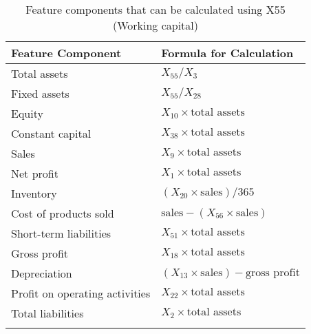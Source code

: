 \documentclass{article}      %
\begin{document}
\FloatBarrier

\begin{table}[!h]
    \centering
    \caption{Feature components that can be calculated using X55 (Working capital)}
    \begin{tabular}{l|l}
    \arrayrulecolor{black}  %
    \toprule
    \textbf{Feature Component} & \textbf{Formula for Calculation} \\
    \midrule
    \arrayrulecolor{lightgray}
    Total assets & $X_{55} / X_3$ \\
    \hline
    Fixed assets & $X_{55} / X_{28}$ \\
    \hline
    Equity & $X_{10} \times \text{total assets}$ \\
    \hline
    Constant capital & $X_{38} \times \text{total assets}$ \\
    \hline
    Sales & $X_9 \times \text{total assets}$ \\
    \hline
    Net profit & $X_1 \times \text{total assets}$ \\
    \hline
    Inventory & $(X_{20} \times \text{sales}) / 365$ \\
    \hline
    Cost of products sold & $\text{sales} - (X_{56} \times \text{sales})$ \\
    \hline
    Short-term liabilities & $X_{51} \times \text{total assets}$ \\
    \hline
    Gross profit & $X_{18} \times \text{total assets}$ \\
    \hline
    Depreciation & $(X_{13} \times \text{sales}) - \text{gross profit}$ \\
    \hline
    Profit on operating activities & $X_{22} \times \text{total assets}$ \\
    \hline
    Total liabilities & $X_2 \times \text{total assets}$ \\
    \arrayrulecolor{black}
    \bottomrule
    \end{tabular}
    \label{table:feature_components}
\end{table}
\end{document}
